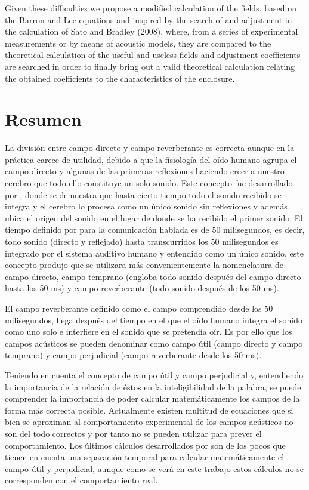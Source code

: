 Given these difficulties we propose a modified calculation of the fields, based on the Barron and Lee equations and inspired by the search of and adjustment in the calculation of Sato and Bradley (2008), where, from a series of experimental measurements or by means of acoustic models, they are compared to the theoretical calculation of the useful and useless fields and adjustment coefficients are searched in order to finally bring out a valid theoretical calculation relating the obtained coefficients to the characteristics of the enclosure.



\chapter*{Resumen}
\thispagestyle{empty}
La división entre campo directo y campo reverberante es correcta aunque en la práctica carece de utilidad, debido a que la fisiología del oído humano agrupa el campo directo y algunas de las primeras reflexiones haciendo creer a nuestro cerebro que todo ello constituye un solo sonido. Este concepto fue desarrollado por \cite{Haas1949}, donde se demuestra que hasta cierto tiempo todo el sonido recibido se integra y el cerebro lo procesa como un único sonido sin reflexiones y además ubica el origen del sonido en el lugar de donde se ha recibido el primer sonido. El tiempo definido por \citeauthor{Haas1949} para la comunicación hablada es de 50 milisegundos, es decir, todo sonido (directo y reflejado) hasta transcurridos los 50 milisegundos es integrado por el sistema auditivo humano y entendido como un único sonido, este concepto produjo que se utilizara más convenientemente la nomenclatura de campo directo, campo temprano (engloba todo sonido después del campo directo hasta los 50 ms) y campo reverberante (todo sonido después de los 50 ms).
 
El campo reverberante definido como el campo comprendido desde los 50 milisegundos, llega después del tiempo en el que el oído humano integra el sonido como uno solo e interfiere en el sonido que se pretendía oír. Es por ello que los campos acústicos se pueden denominar como campo útil (campo directo y campo temprano) y campo perjudicial (campo reverberante desde los 50 ms).
 
Teniendo en cuenta el concepto de campo útil y campo perjudicial y, entendiendo la importancia de la relación de éstos en la inteligibilidad de la palabra, se puede comprender la importancia de poder calcular matemáticamente los campos de la forma más correcta posible. Actualmente existen multitud de ecuaciones que si bien se aproximan al comportamiento experimental de los campos acústicos no son del todo correctos y por tanto no se pueden utilizar para prever el comportamiento. Los últimos cálculos desarrollados por \cite{Barron1988} son de los pocos que tienen en cuenta una separación temporal para calcular matemáticamente el campo útil y perjudicial, aunque como se verá en este trabajo estos cálculos no se corresponden con el comportamiento real.

